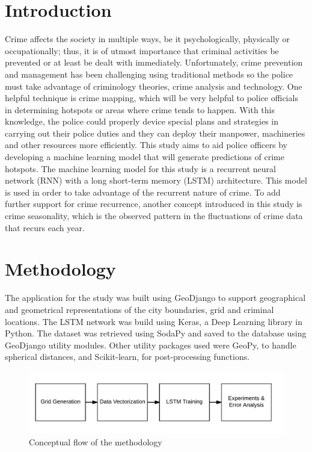 \documentclass[a0]{sciposter}
\begin{document}
    \begin{multicols}{2}
    \section {Introduction}
    Crime affects the society in multiple ways, be it psychologically, physically or occupationally; thus, it is of utmost importance that criminal activities be prevented or at least be dealt with immediately. Unfortunately, crime prevention and management has been challenging using traditional methods so the police must take advantage of criminology theories, crime analysis and technology. One helpful technique is crime mapping, which will be very helpful to police officials in determining hotspots or areas where crime tends to happen. With this knowledge, the police could properly device special plans and strategies in carrying out their police duties and they can deploy their manpower, machineries and other resources more efficiently. This study aims to aid police officers by developing a machine learning model that will generate predictions of crime hotspots. The machine learning model for this study is a recurrent neural network (RNN) with a long short-term memory (LSTM) architecture. This model is used in order to take advantage of the recurrent nature of crime. To add further support for crime recurrence, another concept introduced in this study is crime seasonality, which is the observed pattern in the fluctuations of crime data that recurs each year.
    \section {Methodology}
    The application for the study was built using GeoDjango to support geographical and geometrical representations of the city boundaries, grid and criminal locations. The LSTM network was build using Keras, a Deep Learning library in Python. The dataset was retrieved using SodaPy and saved to the database using GeoDjango utility modules. Other utility packages used were GeoPy, to handle spherical distances, and Scikit-learn, for post-processing functions.

    \begin{figure}[ht]
    \centering
    \includegraphics[width=1\textwidth]{methodology}
    \caption{Conceptual flow of the methodology}
    \end{figure}


\end{multicols}
\end{document}
